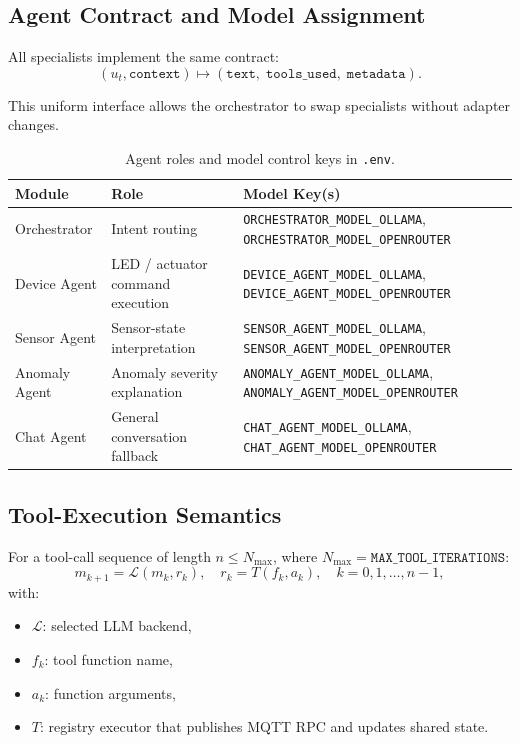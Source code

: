 \subsection{Agent Contract and Model Assignment}
\label{sec:mas-agent-spec}

All specialists implement the same contract:
\begin{equation}
\label{eq:agent-interface}
    (u_t, \texttt{context}) \mapsto
    (\texttt{text},\; \texttt{tools\_used},\; \texttt{metadata}).
\end{equation}

This uniform interface allows the orchestrator to swap specialists
without adapter changes.

\begin{table}[H]
\centering
\caption{Agent roles and model control keys in \texttt{.env}.}
\label{tab:agent-model-map}
\renewcommand{\arraystretch}{1.25}
\begin{tabularx}{\textwidth}{l l X}
    \toprule
    \textbf{Module} & \textbf{Role} & \textbf{Model Key(s)} \\
    \midrule
    Orchestrator & Intent routing
      & \texttt{ORCHESTRATOR\_MODEL\_OLLAMA},
        \texttt{ORCHESTRATOR\_MODEL\_OPENROUTER} \\
    Device Agent & LED / actuator command execution
      & \texttt{DEVICE\_AGENT\_MODEL\_OLLAMA},
        \texttt{DEVICE\_AGENT\_MODEL\_OPENROUTER} \\
    Sensor Agent & Sensor-state interpretation
      & \texttt{SENSOR\_AGENT\_MODEL\_OLLAMA},
        \texttt{SENSOR\_AGENT\_MODEL\_OPENROUTER} \\
    Anomaly Agent & Anomaly severity explanation
      & \texttt{ANOMALY\_AGENT\_MODEL\_OLLAMA},
        \texttt{ANOMALY\_AGENT\_MODEL\_OPENROUTER} \\
    Chat Agent & General conversation fallback
      & \texttt{CHAT\_AGENT\_MODEL\_OLLAMA},
        \texttt{CHAT\_AGENT\_MODEL\_OPENROUTER} \\
    \bottomrule
\end{tabularx}
\end{table}

\subsection{Tool-Execution Semantics}
\label{sec:mas-tool-semantics}

For a tool-call sequence of length $n \leq N_{\max}$, where
$N_{\max}=\texttt{MAX\_TOOL\_ITERATIONS}$:
\begin{equation}
\label{eq:tool-loop}
    m_{k+1} = \mathcal{L}(m_k, r_k), \quad
    r_k = T(f_k, a_k), \quad k = 0,1,\dots,n-1,
\end{equation}
with:
\begin{itemize}
    \item $\mathcal{L}$: selected LLM backend,
    \item $f_k$: tool function name,
    \item $a_k$: function arguments,
    \item $T$: registry executor that publishes MQTT RPC and updates
          shared state.
\end{itemize}

